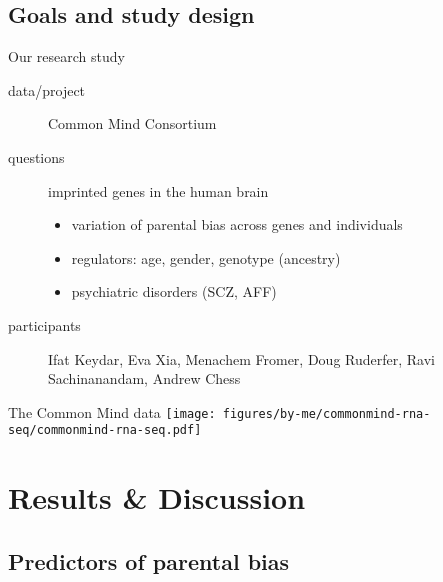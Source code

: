 \documentclass{beamer}
\begin{document}
\subsection{Goals and study design}

\begin{frame}{Our research study}
\begin{description}
\item[data/project] Common Mind Consortium
\item[questions] imprinted genes in the human brain
\begin{itemize}
\item variation of parental bias across genes and individuals
\item regulators: age, gender, genotype (ancestry)
\item psychiatric disorders (SCZ, AFF)  
\end{itemize}
\item[participants] \alert{Ifat Keydar}, Eva Xia, Menachem Fromer, Doug Ruderfer, Ravi Sachinanandam, Andrew Chess
\end{description}
\end{frame}

\begin{frame}[label=cmc]{The Common Mind data}
\texttt{[image: figures/by-me/commonmind-rna-seq/commonmind-rna-seq.pdf]}
\end{frame}

\section{Results \& Discussion}
\subsection{Predictors of parental bias}
\end{document}
